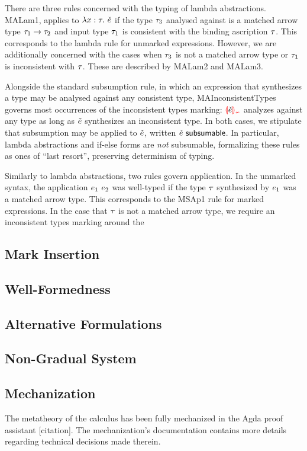 There are three rules concerned with the typing of lambda abstractions. MALam1, applies to
$\lambda x : \tau. ~\check{e}$ if the type $\tau_3$ analysed against is a matched arrow type
$\tau_1 \to \tau_2$ and input type $\tau_1$ is consistent with the binding ascription $\tau$.
This corresponds to the lambda rule for unmarked expressions. However, we are additionally concerned
with the cases when $\tau_3$ is not a matched arrow type or $\tau_1$ is inconsistent with $\tau$.
These are described by MALam2 and MALam3.

Alongside the standard subsumption rule, in which an expression that synthesizes a type may be
analysed against any consistent type, MAInconsistentTypes governs most occurrences of the
inconsistent types marking: $\ECInconType{\ECMV}$ analyzes against any type as long as $\check{e}$
synthesizes an inconsistent type. In both cases, we stipulate that subsumption may be applied to
$\check{e}$, written $\check{e} ~{\normalfont{\normalfont\textsf{subsumable}}}$. In particular, lambda abstractions and if-else forms are
\emph{not} subsumable, formalizing these rules as ones of ``last resort'', preserving determinism of
typing.

Similarly to lambda abstractions, two rules govern application. In the unmarked syntax, the
application $e_1 ~e_2$ was well-typed if the type $\tau$ synthesized by $e_1$ was a
matched arrow type. This corresponds to the MSAp1 rule for marked expressions. In the case that
$\tau$ is not a matched arrow type, we require an inconsistent types marking around the

\subsection{Mark Insertion}

\subsection{Well-Formedness}
\label{sec:calculus-wellformedness}

\subsection{Alternative Formulations}

\subsection{Non-Gradual System}
\label{sec:calculus-non-gradual}

\subsection{Mechanization}
\label{sec:calculus-agda}

The metatheory of the calculus has been fully mechanized in the Agda proof assistant [citation]. The
mechanization's documentation contains more details regarding technical decisions made therein.
